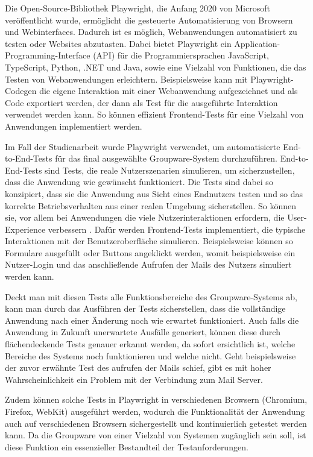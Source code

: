 Die Open-Source-Bibliothek Playwright, die Anfang 2020 von Microsoft veröffentlicht wurde, ermöglicht die gesteuerte Automatisierung von Browsern und Webinterfaces. Dadurch ist es möglich, Webanwendungen automatisiert zu testen oder Websites abzutasten.
Dabei bietet Playwright ein Application-Programming-Interface (API) für die Programmiersprachen JavaScript, TypeScript, Python, .NET und Java, sowie eine Vielzahl von Funktionen, die das Testen von Webanwendungen erleichtern.
Beispielsweise kann mit Playwright-Codegen die eigene Interaktion mit einer Webanwendung aufgezeichnet und als Code exportiert werden, der dann als Test für die ausgeführte Interaktion verwendet werden kann.
So können effizient Frontend-Tests für eine Vielzahl von Anwendungen implementiert werden.
\autocite[Quelle:][]{playwright}

Im Fall der Studienarbeit wurde Playwright verwendet, um automatisierte End-to-End-Tests für das final ausgewählte Groupware-System durchzuführen.
End-to-End-Tests sind Tests, die reale Nutzerszenarien simulieren, um sicherzustellen, dass die Anwendung wie gewünscht funktioniert.
Die Tests sind dabei so konzipiert, dass sie die Anwendung aus Sicht eines Endnutzers testen und so das korrekte Betriebsverhalten aus einer realen Umgebung sicherstellen.
So können sie, vor allem bei Anwendungen die viele Nutzerinteraktionen erfordern, die User-Experience verbessern \autocite[vgl.][]{e2e-blog}.
Dafür werden Frontend-Tests implementiert, die typische Interaktionen mit der Benutzeroberfläche simulieren.
Beispielsweise können so Formulare ausgefüllt oder Buttons angeklickt werden, womit beispielsweise ein Nutzer-Login und das anschließende Aufrufen der Mails des Nutzers simuliert werden kann.

Deckt man mit diesen Tests alle Funktionsbereiche des Groupware-Systems ab, kann man durch das Ausführen der Tests sicherstellen, dass die vollständige Anwendung nach einer Änderung noch wie erwartet funktioniert.
Auch falls die Anwendung in Zukunft unerwartete Ausfälle generiert, können diese durch flächendeckende Tests genauer erkannt werden, da sofort ersichtlich ist, welche Bereiche des Systems noch funktionieren und welche nicht.
Geht beispielsweise der zuvor erwähnte Test des aufrufen der Mails schief, gibt es mit hoher Wahrscheinlichkeit ein Problem mit der Verbindung zum Mail Server.

Zudem können solche Tests in Playwright in verschiedenen Browsern (Chromium, Firefox, WebKit) ausgeführt werden, wodurch die Funktionalität der Anwendung auch auf verschiedenen Browsern sichergestellt und kontinuierlich getestet werden kann.
Da die Groupware von einer Vielzahl von Systemen zugänglich sein soll, ist diese Funktion ein essenzieller Bestandteil der Testanforderungen.








